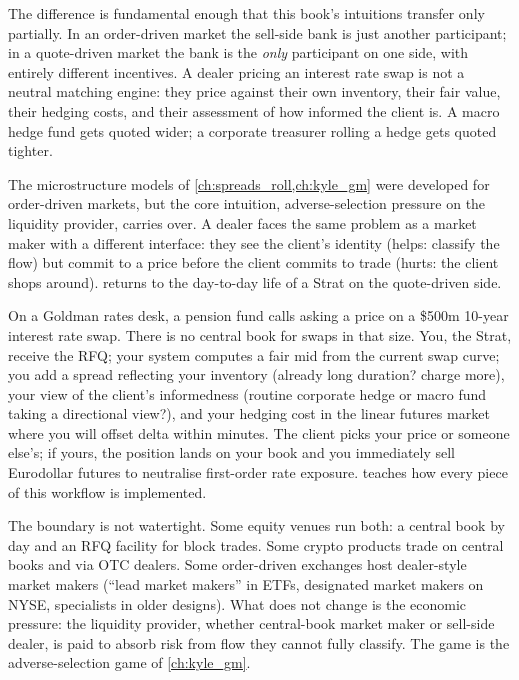 The difference is fundamental enough that this book's intuitions
transfer only partially. In an order-driven market the sell-side bank
is just another participant; in a quote-driven market the bank is the
\emph{only} participant on one side, with entirely different
incentives. A dealer pricing an interest rate swap is not a neutral
matching engine: they price against their own inventory, their fair
value, their hedging costs, and their assessment of how informed the
client is. A macro hedge fund gets quoted wider; a corporate treasurer
rolling a hedge gets quoted tighter.

The microstructure models of \cref{ch:spreads_roll,ch:kyle_gm} were
developed for order-driven markets, but the core intuition,
adverse-selection pressure on the liquidity provider, carries over.
A dealer faces the same problem as a market maker with a different
interface: they see the client's identity (helps: classify the flow)
but commit to a price before the client commits to trade (hurts: the
client shops around).  returns to the day-to-day
life of a Strat on the quote-driven side.

\begin{gsbox}
On a Goldman rates desk, a pension fund calls asking a price on a
\$500m 10-year interest rate swap. There is no central book for swaps
in that size. You, the Strat, receive the RFQ; your system
computes a fair mid from the current swap curve; you add a spread
reflecting your inventory (already long duration? charge more), your
view of the client's informedness (routine corporate hedge or macro
fund taking a directional view?), and your hedging cost in the linear
futures market where you will offset delta within minutes. The client
picks your price or someone else's; if yours, the position lands on
your book and you immediately sell Eurodollar futures to neutralise
first-order rate exposure.  teaches how every
piece of this workflow is implemented.
\end{gsbox}

The boundary is not watertight. Some equity venues run both: a
central book by day and an RFQ facility for block trades. Some crypto
products trade on central books and via OTC dealers. Some order-driven
exchanges host dealer-style market makers (``lead market makers'' in
ETFs, designated market makers on NYSE, specialists in older designs).
What does not change is the economic pressure: the liquidity provider,
whether central-book market maker or sell-side dealer, is paid to
absorb risk from flow they cannot fully classify. The game is the
adverse-selection game of \cref{ch:kyle_gm}.

